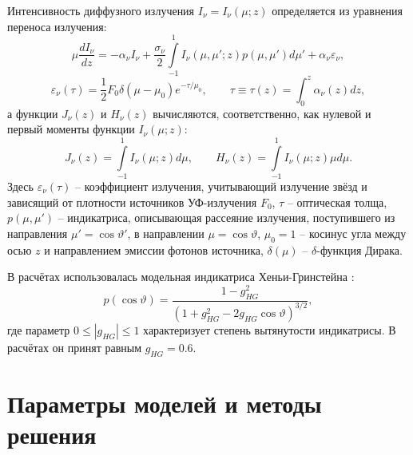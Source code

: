 \documentclass[a4paper,11pt,twoside]{article}
\begin{document}
Интенсивность диффузного излучения $I_\nu = I_\nu(\mu; z)$ определяется из уравнения переноса излучения:
\begin{equation}\label{eq_rad_11}
\mu\frac{d I_{\nu}}{d z} = -\alpha_{\nu} I_{\nu} + \frac{\sigma_{\nu}}{2} \int\limits_{-1}^{1} I_{\nu}(\mu,\mu';z)p(\mu,\mu') d\mu' + \alpha_{\nu}\varepsilon_{\nu},
\end{equation}
\begin{equation} \label{eq_rad_2}
\varepsilon_{\nu}(\tau)=
\frac{1}{2}F_0\delta(\mu-\mu_0)e^{-\tau/\mu_0}, \qquad \tau \equiv \tau(z) = \int_0^z{\alpha_{\nu}(z)dz},
\end{equation}
а функции $J_\nu(z)$ и $H_\nu(z)$ вычисляются, соответственно, как нулевой и первый моменты функции $I_\nu(\mu; z)$:
\begin{equation}\label{eq_rad_3}
J_\nu(z) = \int\limits_{-1}^{1} I_\nu(\mu; z) d\mu, \qquad H_\nu(z) = \int\limits_{-1}^{1} I_\nu(\mu; z)\mu d\mu.
\end{equation}
Здесь $\varepsilon_{\nu}(\tau)$ -- коэффициент  излучения, учитывающий излучение звёзд и зависящий от плотности источников УФ-излучения $F_0$,
$\tau$ -- оптическая толща, $p(\mu,\mu')$ -- индикатриса, описывающая рассеяние излучения, поступившего из направления  $\mu'=\cos\vartheta'$, в направлении $\mu=\cos\vartheta$, $\mu_0 = 1$ -- косинус угла между осью $z$ и направлением эмиссии фотонов источника, $\delta(\mu)$ -- $\delta$-функция Дирака. %

В расчётах использовалась модельная индикатриса Хеньи-Гринстейна \cite{Briegleb2007}:
\begin{equation} \label{eq_rad_4}
p(\cos\vartheta) = \frac{1-g_{HG}^2}{(1 + g_{HG}^2 - 2g_{HG}\cos\vartheta)^{3/2}},
\end{equation}
где параметр $0\le |g_{HG}| \le 1$ характеризует степень вытянутости индикатрисы. В расчётах он принят равным $g_{HG} = 0.6$.

\section{Параметры моделей и методы решения}
\end{document}
